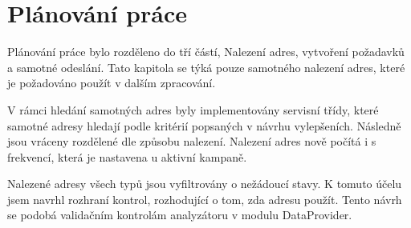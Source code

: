 \documentclass[thesis=B,czech]{FITthesis}[2012/06/26]
\begin{document}
\section{Plánování práce}\label{ch:planning}
Plánování práce bylo rozděleno do tří částí, Nalezení adres, vytvoření požadavků a samotné odeslání.
Tato kapitola se týká pouze samotného nalezení adres, které je požadováno použít v dalším zpracování.
\par
V rámci hledání samotných adres byly implementovány servisní třídy, které samotné adresy hledají podle kritérií popsaných v 
návrhu vylepšeních. Následně jsou vráceny rozdělené dle způsobu nalezení. Nalezení adres nově počítá i s frekvencí, 
která je nastavena u aktivní kampaně.
\par
Nalezené adresy všech typů jsou vyfiltrovány o nežádoucí stavy. K tomuto účelu jsem navrhl rozhraní kontrol, rozhodující 
o tom, zda adresu použít. Tento návrh se podobá validačním kontrolám analyzátoru v modulu DataProvider.
\end{document}

